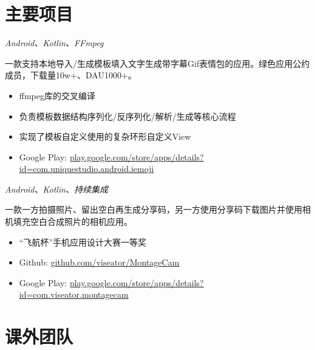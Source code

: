 \documentclass{uniquecv}
\begin{document}

\section{主要项目}

\textit{Android、Kotlin、FFmpeg}
\vspace{0.4ex}

一款支持本地导入/生成模板填入文字生成带字幕Gif表情包的应用。绿色应用公约成员，下载量10w+、DAU1000+。

\begin{itemize}
  \item ffmpeg库的交叉编译
  \item 负责模板数据结构序列化/反序列化/解析/生成等核心流程
  \item 实现了模板自定义使用的复杂环形自定义View
  \item Google Play: \href{https://play.google.com/store/apps/details?id=com.uniquestudio.android.iemoji}{\uline{play.google.com/store/apps/details?id=com.uniquestudio.android.iemoji}}
\end{itemize}


\textit{Android、Kotlin、持续集成}
\vspace{0.4ex}

一款一方拍摄照片、留出空白再生成分享码，另一方使用分享码下载图片并使用相机填充空白合成照片的相机应用。

\begin{itemize}
  \item “飞航杯”手机应用设计大赛\hspace{1ex}一等奖
  \item Github: \href{https://github.com/viseator/MontageCam}{\uline{github.com/viseator/MontageCam}}
  \item Google Play: \href{https://play.google.com/store/apps/details?id=com.viseator.montagecam}{\uline{play.google.com/store/apps/details?id=com.viseator.montagecam}}
\end{itemize}


\section{课外团队}
\end{document}
